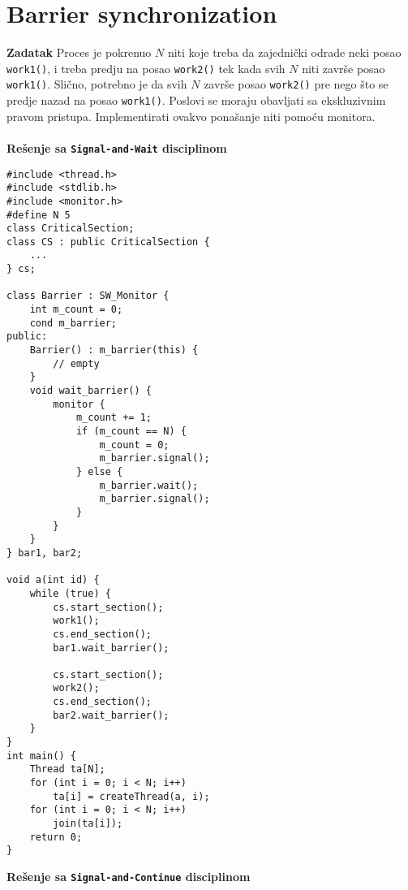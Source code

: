 \clearpage
\section{\latin Barrier synchronization}
\textbf{\large Zadatak} Proces je pokrenuo $N$ niti koje treba da zajedni\v{c}ki odrade neki posao \texttt{work1()}, i treba predju na posao \texttt{work2()} tek kada svih $N$ niti zavr\v{s}e posao \texttt{work1()}. Sli\v{c}no, potrebno je da svih $N$ zavr\v{s}e posao \texttt{work2()} pre nego \v{s}to se predje nazad na posao \texttt{work1()}. Poslovi se moraju obavljati sa ekskluzivnim pravom pristupa. Implementirati ovakvo pona\v{s}anje niti pomo\'{c}u monitora.
\\\\
\textbf{Re\v{s}enje sa \texttt{Signal-and-Wait} disciplinom}
\begin{lstlisting}
#include <thread.h>
#include <stdlib.h>
#include <monitor.h>
#define N 5
class CriticalSection;
class CS : public CriticalSection {
    ...
} cs;

class Barrier : SW_Monitor {
    int m_count = 0;
    cond m_barrier;
public:
    Barrier() : m_barrier(this) {
        // empty
    }
    void wait_barrier() {
        monitor {
            m_count += 1;
            if (m_count == N) {
                m_count = 0;
                m_barrier.signal();
            } else {
                m_barrier.wait();
                m_barrier.signal();
            }
        }
    }
} bar1, bar2;

void a(int id) {
    while (true) {
        cs.start_section();
        work1();
        cs.end_section();
        bar1.wait_barrier();

        cs.start_section();
        work2();
        cs.end_section();
        bar2.wait_barrier();
    }
}
int main() {
    Thread ta[N];
    for (int i = 0; i < N; i++) 
        ta[i] = createThread(a, i);
    for (int i = 0; i < N; i++) 
        join(ta[i]);
    return 0;
}

\end{lstlisting}
\textbf{Re\v{s}enje sa \texttt{Signal-and-Continue} disciplinom}
